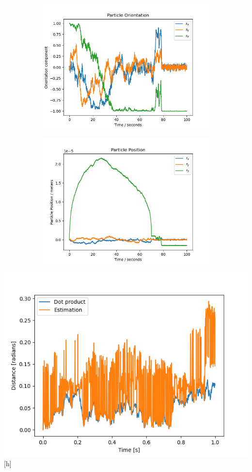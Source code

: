 \documentclass[11pt]{article}
\begin{document}
\begin{figure}
	\begin{subfigure}{0.5\textwidth}
		\includegraphics[width =\textwidth]{traj.png}
	\end{subfigure}
	\begin{subfigure}{0.5\textwidth]}
		\includegraphics[width=\textwidth]{pos.png}
	\end{subfigure}
\end{figure}

\includegraphics{Divergance.png}[h]



\end{document}
